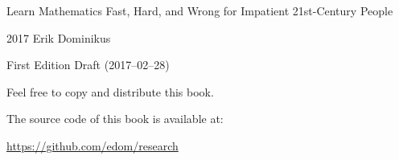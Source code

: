 {
    \setlength\parindent{0em}
    Learn Mathematics Fast, Hard, and Wrong for Impatient 21st-Century People\par\vspace{1em}
    \textcopyright{} 2017 Erik Dominikus\par\vspace{1em}
    First Edition Draft (2017--02--28)\par\vspace{1em}
    Feel free to copy and distribute this book.\par\vspace{1em}
    The source code of this book is available at:\par\vspace{1em}
    \url{https://github.com/edom/research}\par
}
